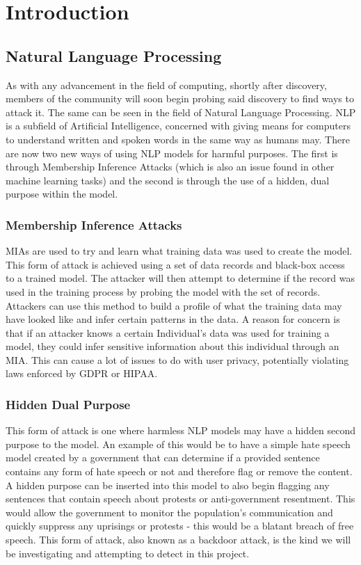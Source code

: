 \chapter{Introduction}

\section{Natural Language Processing}

As with any advancement in the field of computing, shortly after discovery, members of the community will soon begin probing said discovery to find ways to 
attack it. The same can be seen in the field of Natural Language Processing. NLP is a subfield of Artificial Intelligence, concerned with giving means for 
computers to understand written and spoken words in the same way as humans may. There are now two new ways of using NLP models for harmful purposes. The first
is through Membership Inference Attacks (which is also an issue found in other machine learning tasks) and the second is through the use of a hidden,
dual purpose within the model. 

\subsection{Membership Inference Attacks}

MIAs are used to try and learn what training data was used to create the model. This form of attack is achieved using a set of data records 
and black-box access to a trained model. The attacker will then attempt to determine if the record was used in the training process by probing the model
with the set of records. Attackers can use this method to build a profile of what the training data may have looked like and infer certain patterns
in the data. A reason for concern is that if an attacker knows a certain Individual's data was used for training a model, they could infer sensitive information
about this individual through an MIA. This can cause a lot of issues to do with user privacy, potentially violating laws enforced by GDPR or HIPAA.

\subsection{Hidden Dual Purpose}

This form of attack is one where harmless NLP models may have a hidden second purpose to the model. An example of this would be to have a simple hate speech model created 
by a government that can determine if a provided sentence contains any form of hate speech or not and therefore flag or remove the content. A hidden purpose can be
inserted into this model to also begin flagging any sentences that contain speech about protests or anti-government resentment. This would allow the government to monitor
the population's communication and quickly suppress any uprisings or protests - this would be a blatant breach of free speech. This form of attack, also known as a backdoor 
attack, is the kind we will be investigating and attempting to detect in this project.

